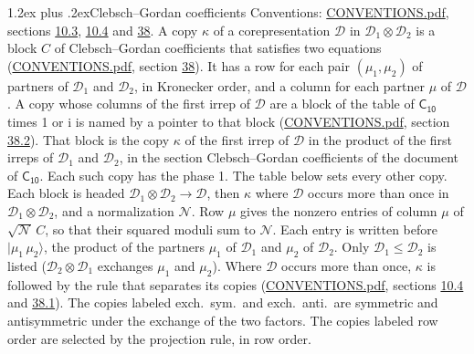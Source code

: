 \documentclass[10pt,a4paper]{article}
\makeatletter
\renewcommand\section{\@startsection{section}{1}{\z@}{-3ex plus -1ex minus -.2ex}%
  {1.2ex plus .2ex}{\normalfont\large\sffamily\bfseries\color{parttitle}}}
\numberwithin{equation}{section}
\newcommand{\grp}[1]{\mathsf{#1}}
\newcommand{\iunit}{\mathrm{i}}
\newcommand{\irrprod}{\otimes}
\newcommand{\mult}{\kappa}
\newcommand{\intx}{\mu}
\newcommand{\cgnorm}{\mathcal{N}}
\newcommand{\prodket}[2]{\lvert {#1}\,{#2}\rangle}
\makeatother
\begin{document}
\section{Clebsch--Gordan coefficients}\label{s:clebsch_gordan}
Conventions: \href{../../CONVENTIONS.pdf}{CONVENTIONS.pdf}, sections \href{../../../rotation/CONVENTIONS.pdf\#conv.10.3}{10.3}, \href{../../../rotation/CONVENTIONS.pdf\#conv.10.4}{10.4} and \href{../../CONVENTIONS.pdf\#conv.38}{38}.
\leavevmode\label{n:index.copy}\label{n:matrix.cg.stored}A copy $\mult$ of a corepresentation $\mathcal{D}$ in $\mathcal{D}_1\irrprod\mathcal{D}_2$ is a block $C$ of Clebsch--Gordan coefficients that satisfies two equations (\href{../../CONVENTIONS.pdf}{CONVENTIONS.pdf}, section \href{../../CONVENTIONS.pdf\#conv.38}{38}). \label{n:index.cg}It has a row for each pair $(\intx_1, \intx_2)$ of partners of $\mathcal{D}_1$ and $\mathcal{D}_2$, in Kronecker order, and a column for each partner $\intx$ of $\mathcal{D}$.
A copy whose columns of the first irrep of $\mathcal{D}$ are a block of the table of $\grp{C_{10}}$ times 1 or $\iunit$ is named by a pointer to that block (\href{../../CONVENTIONS.pdf}{CONVENTIONS.pdf}, section \href{../../CONVENTIONS.pdf\#conv.38.2}{38.2}). That block is the copy $\mult$ of the first irrep of $\mathcal{D}$ in the product of the first irreps of $\mathcal{D}_1$ and $\mathcal{D}_2$, in the section Clebsch--Gordan coefficients of the document of \href{../../../rotation/data/pdf/C10.pdf}{$\grp{C_{10}}$}. Each such copy has the phase 1. The table below sets every other copy.
Each block is headed $\mathcal{D}_1\irrprod\mathcal{D}_2\to\mathcal{D}$, then $\mult$ where $\mathcal{D}$ occurs more than once in $\mathcal{D}_1\irrprod\mathcal{D}_2$, and a normalization $\cgnorm$. Row $\intx$ gives the nonzero entries of column $\intx$ of $\sqrt{\cgnorm}\,C$, so that their squared moduli sum to $\cgnorm$. \label{n:vector.ket.product}Each entry is written before $\prodket{\intx_1}{\intx_2}$, the product of the partners $\intx_1$ of $\mathcal{D}_1$ and $\intx_2$ of $\mathcal{D}_2$. Only $\mathcal{D}_1 \le \mathcal{D}_2$ is listed ($\mathcal{D}_2\irrprod\mathcal{D}_1$ exchanges $\intx_1$ and $\intx_2$).
Where $\mathcal{D}$ occurs more than once, $\mult$ is followed by the rule that separates its copies (\href{../../CONVENTIONS.pdf}{CONVENTIONS.pdf}, sections \href{../../../rotation/CONVENTIONS.pdf\#conv.10.4}{10.4} and \href{../../CONVENTIONS.pdf\#conv.38.1}{38.1}). \label{n:abbreviation.exchange}The copies labeled exch.\ sym.\ and exch.\ anti.\ are symmetric and antisymmetric under the exchange of the two factors. The copies labeled row order are selected by the projection rule, in row order.
\end{document}
